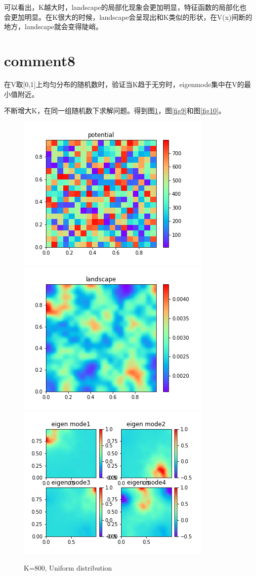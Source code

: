 \documentclass[UTF8,12pt]{article}
\begin{document}
可以看出，K越大时，landscape的局部化现象会更加明显，特征函数的局部化也会更加明显。在K很大的时候，landscape会呈现出和K类似的形状，在V(x)间断的地方，landscape就会变得陡峭。

\section{comment8}

在V取[0,1]上均匀分布的随机数时，验证当K趋于无穷时，eigenmode集中在V的最小值附近。

不断增大K，在同一组随机数下求解问题。得到图\ref{fig8}，图\ref{fig9}和图\ref{fig10}。

\begin{figure}[htbp]
    \centering
    \includegraphics[width=0.3\linewidth]{../pics/v8}
    \includegraphics[width=0.3\linewidth]{../pics/w8}
    \includegraphics[width=0.3\linewidth]{../pics/u8}
    \caption{K=800, Uniform distribution}
    \label{fig8}
\end{figure}
\end{document}
